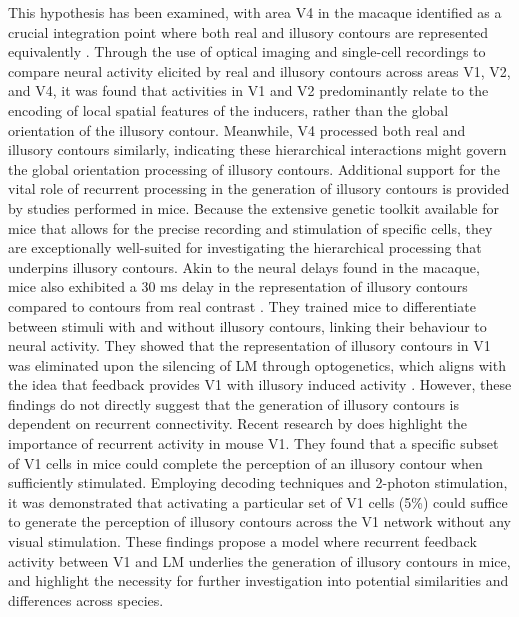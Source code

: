 \documentclass[12pt]{article}
\begin{document}
This hypothesis has been examined, with area V4 in the macaque identified as a crucial integration point where both real and illusory contours are represented equivalently \autocite{panEquivalentRepresentationReal2012}. Through the use of optical imaging and single-cell recordings to compare neural activity elicited by real and illusory contours across areas V1, V2, and V4, it was found that activities in V1 and V2 predominantly relate to the encoding of local spatial features of the inducers, rather than the global orientation of the illusory contour. Meanwhile, V4 processed both real and illusory contours similarly, indicating these hierarchical interactions might govern the global orientation processing of illusory contours. Additional support for the vital role of recurrent processing in the generation of illusory contours is provided by studies performed in mice. Because the extensive genetic toolkit available for mice that allows for the precise recording and stimulation of specific cells, they are exceptionally well-suited for investigating the hierarchical processing that underpins illusory contours. Akin to the neural delays found in the macaque, mice also exhibited a 30 ms delay in the representation of illusory contours compared to contours from real contrast \autocite{pakTopDownFeedbackControls2020}. They trained mice to differentiate between stimuli with and without illusory contours, linking their behaviour to neural activity. They showed that the representation of illusory contours in V1 was eliminated upon the silencing of LM through optogenetics, which aligns with the idea that feedback provides V1 with illusory induced activity \autocite{wyatteEarlyRecurrentFeedback2014}. However, these findings do not directly suggest that the generation of illusory contours is dependent on recurrent connectivity. Recent research by \textcite{shinRecurrentPatternCompletion2023} does highlight the importance of recurrent activity in mouse V1. They found that a specific subset of V1 cells in mice could complete the perception of an illusory contour when sufficiently stimulated. Employing decoding techniques and 2-photon stimulation, it was demonstrated that activating a particular set of V1 cells (5\%) could suffice to generate the perception of illusory contours across the V1 network without any visual stimulation. These findings propose a model where recurrent feedback activity between V1 and LM underlies the generation of illusory contours in mice, and highlight the necessity for further investigation into potential similarities and differences across species.
\end{document}

